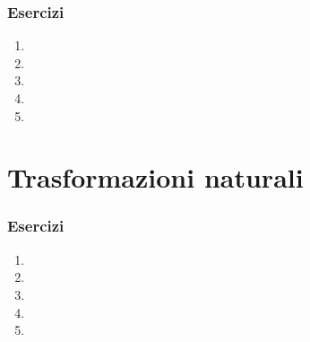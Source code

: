 \subsubsection*{Esercizi}
\begin{enumerate}
    \item
    \item
    \item
    \item
    \item
\end{enumerate}


\section{Trasformazioni naturali}

\subsubsection*{Esercizi}
\begin{enumerate}
    \item
    \item
    \item
    \item
    \item
\end{enumerate}
